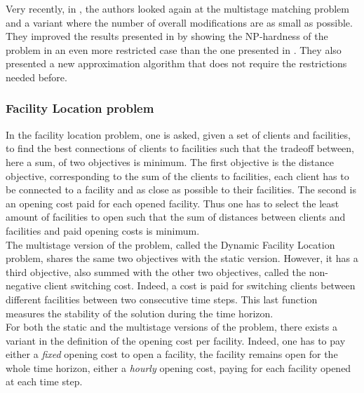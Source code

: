 \documentclass[a4paper]{book}
\begin{document}
Very recently, in \cite{chimani2020approximating}, the authors looked again at the {\sc multistage matching} problem and a variant where the number of overall modifications are as small as possible. They improved the results presented in \cite{bampis2018multistage} by showing the NP-hardness of the problem in an even more restricted case than the one presented in \cite{bampis2018multistage}. They also presented a new approximation algorithm that does not require the restrictions needed before.

\subsubsection{Facility Location problem}

In the {\sc facility location }problem, one is asked, given a set of clients and facilities, to find the best connections of clients to facilities such that the tradeoff between, here a sum, of two objectives is minimum. The first objective is the distance objective, corresponding to the sum of the clients to facilities, each client has to be connected to a facility and as close as possible to their facilities. The second is an opening cost paid for each opened facility. Thus one has to select the least amount of facilities to open such that the sum of distances between clients and facilities and paid opening costs is minimum.\\
The multistage version of the problem, called the {\sc Dynamic Facility Location problem}, shares the same two objectives with the static version. However, it has a third objective, also summed with the other two objectives, called the non-negative client switching cost. Indeed, a cost is paid for switching clients between different facilities between two consecutive time steps. This last function measures the stability of the solution during the time horizon.\\

For both the static and the multistage versions of the problem, there exists a variant in the definition of the opening cost per facility. Indeed, one has to pay either a \textit{fixed} opening cost to open a facility, the facility remains open for the whole time horizon, either a \textit{hourly} opening cost, paying for each facility opened at each time step.\\
\end{document}
